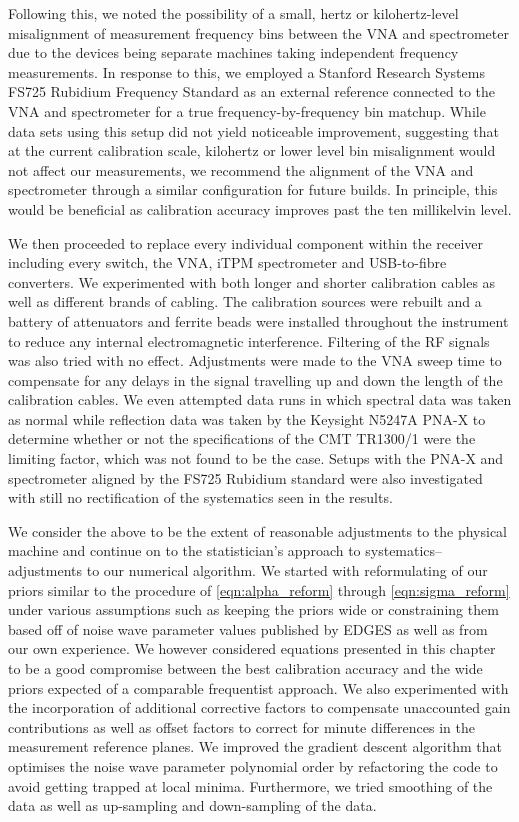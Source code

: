 Following this, we noted the possibility of a small, hertz or kilohertz-level misalignment of measurement frequency bins between the VNA and spectrometer due to the devices being separate machines taking independent frequency measurements. In response to this, we employed a Stanford Research Systems FS725 Rubidium Frequency Standard as an external reference connected to the VNA and spectrometer for a true frequency-by-frequency bin matchup. While data sets using this setup did not yield noticeable improvement, suggesting that at the current calibration scale, kilohertz or lower level bin misalignment would not affect our measurements, we recommend the alignment of the VNA and spectrometer through a similar configuration for future builds. In principle, this would be beneficial as calibration accuracy improves past the ten millikelvin level.

We then proceeded to replace every individual component within the receiver including every switch, the VNA, iTPM spectrometer and USB-to-fibre converters. We experimented with both longer and shorter calibration cables as well as different brands of cabling. The calibration sources were rebuilt and a battery of attenuators and ferrite beads were installed throughout the instrument to reduce any internal electromagnetic interference. Filtering of the RF signals was also tried with no effect. Adjustments were made to the VNA sweep time to compensate for any delays in the signal travelling up and down the length of the calibration cables. We even attempted data runs in which spectral data was taken as normal while reflection data was taken by the Keysight N5247A PNA-X to determine whether or not the specifications of the CMT TR1300/1 were the limiting factor, which was not found to be the case. Setups with the PNA-X and spectrometer aligned by the FS725 Rubidium standard were also investigated with still no rectification of the systematics seen in the results.

We consider the above to be the extent of reasonable adjustments to the physical machine and continue on to the statistician’s approach to systematics--adjustments to our numerical algorithm. We started with reformulating of our priors similar to the procedure of \cref{eqn:alpha_reform} through \cref{eqn:sigma_reform} under various assumptions such as keeping the priors wide or constraining them based off of noise wave parameter values published by EDGES as well as from our own experience. We however considered equations presented in this chapter to be a good compromise between the best calibration accuracy and the wide priors expected of a comparable frequentist approach. We also experimented with the incorporation of additional corrective factors to compensate unaccounted gain contributions as well as offset factors to correct for minute differences in the measurement reference planes. We improved the gradient descent algorithm that optimises the noise wave parameter polynomial order by refactoring the code to avoid getting trapped at local minima. Furthermore, we tried smoothing of the data as well as up-sampling and down-sampling of the data.

